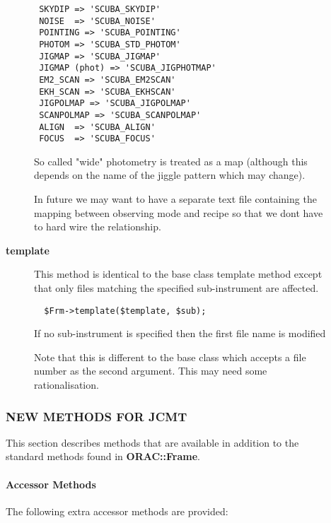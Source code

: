 \begin{description}
\begin{description}
\begin{verbatim}
 SKYDIP => 'SCUBA_SKYDIP'
 NOISE  => 'SCUBA_NOISE'
 POINTING => 'SCUBA_POINTING'
 PHOTOM => 'SCUBA_STD_PHOTOM'
 JIGMAP => 'SCUBA_JIGMAP'
 JIGMAP (phot) => 'SCUBA_JIGPHOTMAP'
 EM2_SCAN => 'SCUBA_EM2SCAN'
 EKH_SCAN => 'SCUBA_EKHSCAN'
 JIGPOLMAP => 'SCUBA_JIGPOLMAP'
 SCANPOLMAP => 'SCUBA_SCANPOLMAP'
 ALIGN  => 'SCUBA_ALIGN'
 FOCUS  => 'SCUBA_FOCUS'
\end{verbatim}


So called "wide" photometry is treated as a map (although this
depends on the name of the jiggle pattern which may change).



In future we may want to have a separate text file containing
the mapping between observing mode and recipe so that
we dont have to hard wire the relationship.


\item[{\textbf{template}}] \mbox{}

This method is identical to the base class template method
except that only files matching the specified sub-instrument
are affected.

\begin{verbatim}
  $Frm->template($template, $sub);
\end{verbatim}


If no sub-instrument is specified then the first file name
is modified



Note that this is different to the base class which accepts
a file number as the second argument. This may need some
rationalisation.

\end{description}
\subsubsection*{NEW METHODS FOR JCMT\label{ORAC::Frame::JCMT_NEW_METHODS_FOR_JCMT}}


This section describes methods that are available in addition
to the standard methods found in \textbf{ORAC::Frame}.

\paragraph*{Accessor Methods\label{ORAC::Frame::JCMT_Accessor_Methods}}


The following extra accessor methods are provided:


\end{description}
